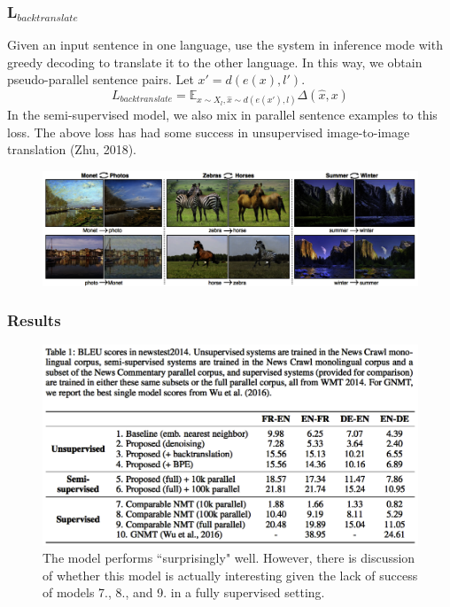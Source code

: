 \documentclass{beamer}
\begin{document}
\begin{frame}
\frametitle{L$_{backtranslate}$}
Given an input sentence in one language, use the system in inference mode with greedy decoding to translate it to the other language. In this way, we obtain pseudo-parallel sentence pairs. Let $x'=d(e(x),l')$.
$$ L_{backtranslate} = \mathbb{E}_{x\sim X_l, \hat{x}\sim d(e(x'),l)}\Delta(\hat{x},x) $$
In the semi-supervised model, we also mix in parallel sentence examples to this loss. The above loss has had some success in unsupervised image-to-image translation (Zhu, 2018).\\
\begin{figure}
  \centering
  \includegraphics[width=\textwidth]{pres_imgs/imagetran}
\end{figure}
\end{frame}

\begin{frame}
\frametitle{Results}
 \begin{figure}
  \centering
  \includegraphics[width=.9\textwidth]{pres_imgs/unsupresults}
  \caption{\label{fig:unsupresults} The model performs ``surprisingly" well. However, there is discussion of whether this model is actually interesting given the lack of success of models 7., 8., and 9. in a fully supervised setting.}
\end{figure}
\end{frame}
\end{document}
